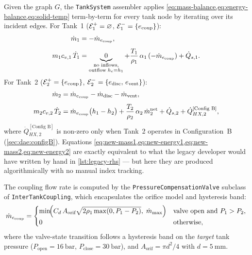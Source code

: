 Given the graph $G$, the \texttt{TankSystem} assembler applies
\cref{eq:mass-balance,eq:energy-balance,eq:solid-temp} term-by-term for every
tank node by iterating over its incident edges.  For Tank~1
($\mathcal{E}_1^+ = \varnothing$, $\mathcal{E}_1^- = \{e_\text{coup}\}$):
\begin{align}
  \dot{m}_1 &= -\dot{m}_{e_\text{coup}}, \label{eq:new-mass1} \\[4pt]
  m_1 c_{v,1}\,\dot{T}_1 &=
    \underbrace{0}_{\substack{\text{no inflows,}\\\text{outflow}\;h_e=h_1}}
    + \frac{T_1}{\rho_1}\,\alpha_1\,(-\dot{m}_{e_\text{coup}})
    + \dot{Q}_{s,1}. \label{eq:new-energy1}
\end{align}
For Tank~2 ($\mathcal{E}_2^+ = \{e_\text{coup}\}$,
$\mathcal{E}_2^- = \{e_\text{disc},\, e_\text{vent}\}$):
\begin{align}
  \dot{m}_2 &= \dot{m}_{e_\text{coup}} - \dot{m}_\text{disc} - \dot{m}_\text{vent},
    \label{eq:new-mass2} \\[4pt]
  m_2 c_{v,2}\,\dot{T}_2 &=
    \dot{m}_{e_\text{coup}}\bigl(h_1 - h_2\bigr)
    + \frac{T_2}{\rho_2}\,\alpha_2\,\dot{m}_2^{\text{net}}
    + \dot{Q}_{s,2}
    + \dot{Q}_{HX,2}^{[\text{Config B}]}, \label{eq:new-energy2}
\end{align}
where $\dot{Q}_{HX,2}^{[\text{Config B}]}$ is non-zero only when Tank~2
operates in Configuration~B (\cref{sec:dae:configB}).  Equations
\cref{eq:new-mass1,eq:new-energy1,eq:new-mass2,eq:new-energy2} are exactly
equivalent to what the legacy developer would have written by hand in
\cref{lst:legacy-rhs} --- but here they are produced algorithmically with no
manual index tracking.

The coupling flow rate is computed by the \texttt{PressureCompensationValve}
subclass of \texttt{InterTankCoupling}, which encapsulates the orifice model
and hysteresis band:
\begin{equation}
  \dot{m}_{e_\text{coup}} =
  \begin{cases}
    \min\!\Bigl(C_d\,A_\text{orif}\sqrt{2\rho_1\max(0, P_1-P_2)},\;
               \dot{m}_{\max}\Bigr)
      & \text{valve open and } P_1 > P_2, \\
    0 & \text{otherwise},
  \end{cases}
  \label{eq:orifice-new}
\end{equation}
where the valve-state transition follows a hysteresis band on the \emph{target}
tank pressure ($P_\text{open} = \SI{16}{\bar}$, $P_\text{close} = \SI{30}{\bar}$),
and $A_\text{orif} = \pi d^2/4$ with $d = \SI{5}{\milli\metre}$.

